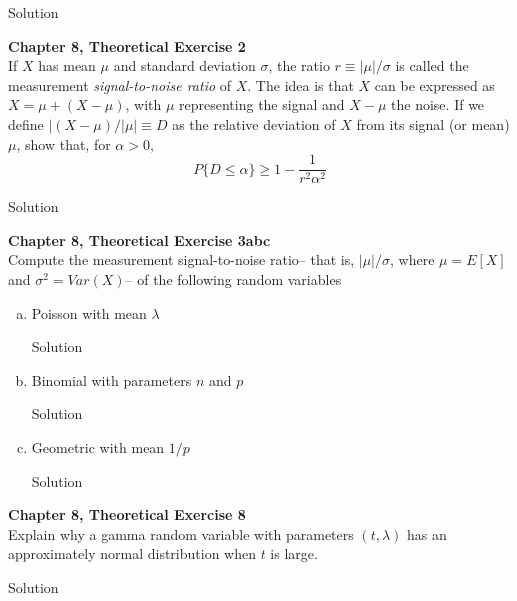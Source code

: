 \documentclass{article}
\begin{document}
\begin{spacing}{1.1}
\begin{homeworkProblem}
\begin{homeworkSection}{Solution}
  \end{homeworkSection}
\end{homeworkProblem}

\newpage
\begin{homeworkProblem}
  {\bf Chapter 8, Theoretical Exercise 2}\\
  If $X$ has mean $\mu$ and standard deviation $\sigma$, the ratio 
  $r \equiv |\mu|/\sigma$ is called the measurement \emph{signal-to-noise ratio} 
  of $X$. The idea is that $X$ can be expressed as $X = \mu + (X − \mu)$, with $\mu$ 
  representing the signal and $X − \mu$ the noise. If we define 
  $|(X − \mu)/|\mu| \equiv D$ as the relative deviation of $X$ from its signal 
  (or mean) $\mu$, show that, for $\alpha > 0$,
    \[P\{ D \le \alpha\} \ge 1 - \frac{ 1}{ r^2 \alpha^2}\]
  \begin{homeworkSection}{Solution}
    
  \end{homeworkSection}
\end{homeworkProblem}

\newpage
\begin{homeworkProblem}
  {\bf Chapter 8, Theoretical Exercise 3abc}\\
  Compute the measurement signal-to-noise ratio--
  that is, $|\mu|/\sigma$, where $\mu = E[ X]$ and $\sigma^2 = Var( X)$--
  of the following random variables
  \begin{enumerate}[(a)]
    \item Poisson with mean $\lambda$
      \begin{homeworkSection}{Solution}
      
      \end{homeworkSection}
    \item Binomial with parameters $n$ and $p$
      \begin{homeworkSection}{Solution}
      
      \end{homeworkSection}
    \item Geometric with mean $1/p$
      \begin{homeworkSection}{Solution}
      
      \end{homeworkSection}
  \end{enumerate}
\end{homeworkProblem}

\newpage
\begin{homeworkProblem}
  {\bf Chapter 8, Theoretical Exercise 8}\\
  Explain why a gamma random variable with parameters $(t, \lambda)$ has 
  an approximately normal distribution when $t$ is large.
  \begin{homeworkSection}{Solution}
    
  \end{homeworkSection}
\end{homeworkProblem}


\end{spacing}
\end{document}
